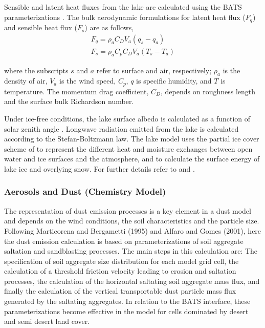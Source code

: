 Sensible and latent heat fluxes from the lake are calculated using  the BATS
parameterizations \cite{Dickinson_93}.  The bulk aerodynamic formulations for
latent heat flux ($F_q$) and sensible heat flux ($F_s$) are as follows,
\begin{eqnarray} F_q = \rho_a C_D V_a (q_s - q_a) \\ F_s = \rho_a C_p C_D V_a
(T_s - T_a) \end{eqnarray}

\noindent where the subscripts $s$ and $a$ refer to surface and air,
respectively; $\rho_a$ is the density of air, $V_a$ is the wind speed, $C_p$,
$q$ is specific humidity, and $T$ is temperature.  The momentum drag
coefficient, $C_D$, depends on roughness length and the surface bulk Richardson
number.


Under ice-free conditions, the lake surface albedo is calculated as a function
of solar zenith angle \cite{Henderson-Sellers_86}.  Longwave radiation emitted
from the lake is calculated according to the Stefan-Boltzmann law.  The lake
model uses the partial ice cover scheme of \cite{Patterson_88} to represent the
different heat and moisture exchanges between open water and ice surfaces and
the atmosphere, and to calculate the surface energy of lake ice and overlying
snow.  For further details refer to \cite{Hostetler_93} and \cite{Small_99b}. 

\subsubsection{Aerosols and Dust (Chemistry Model)} The representation of dust
emission processes is a key element in a dust model and depends on the wind
conditions, the soil characteristics and the particle size. Following
Marticorena and Bergametti (1995) and Alfaro and Gomes (2001), here the dust
emission calculation is based on parameterizations of soil aggregate saltation
and sandblasting processes. The main steps in this calculation are: The
specification of soil aggregate size distribution for each model grid cell, the
calculation of a threshold friction velocity leading to erosion and saltation
processes, the calculation of the horizontal saltating soil aggregate mass flux,
and finally the calculation of the vertical transportable dust particle mass
flux generated by the saltating aggregates. In relation to the BATS interface,
these parameterizations become effective in the model for cells dominated by
desert and semi desert land cover. 

